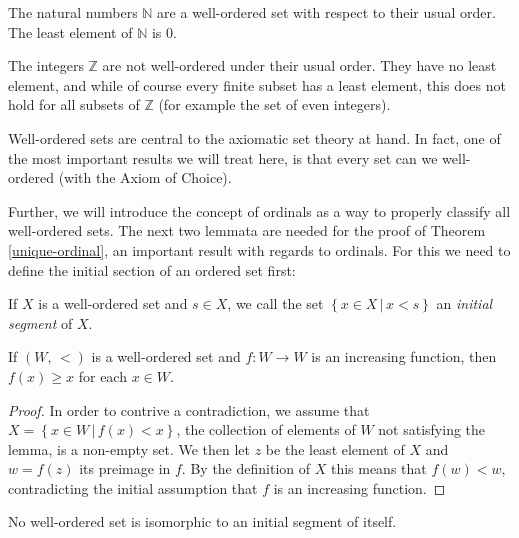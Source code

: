 \documentclass[../../main.tex]{subfiles}
\begin{document}
\begin{example}
    The natural numbers $\mathbb{N}$ are a well-ordered set with respect to their usual order.
    The least element of $\mathbb{N}$ is $0$.
\end{example}

\begin{example}
    The integers $\mathbb{Z}$ are not well-ordered under their usual order.
    They have no least element, and while of course every finite subset has a least element, 
    this does not hold for all subsets of $\mathbb{Z}$ (for example the set of even integers).
\end{example}

Well-ordered sets are central to the axiomatic set theory at hand.
In fact, one of the most important results we will treat here, is that every set can we well-ordered (with the Axiom of Choice).

Further, we will introduce the concept of ordinals as a way to properly classify all well-ordered sets.
The next two lemmata are needed for the proof of Theorem \ref{unique-ordinal}, an important result with regards to ordinals.
For this we need to define the initial section of an ordered set first:

\begin{definition}
    If $X$ is a well-ordered set and $s \in X$, we call the set $\left\{x \in X \,\vert\, x < s\right\}$ an \textit{initial segment} of $X$.
\end{definition}

\begin{lemma}\label{increasing-fcn-lemm}\cite[Lemma 2.1, p.13]{Jec78}
    If $\left(W,\, <\right)$ is a well-ordered set and $f: W \to W$ is an increasing function, then $f(x) \geq x$ for each $x\in W$.
\end{lemma}

\begin{proof}
    In order to contrive a contradiction, we assume that $X = \left\{x \in W \,\vert\, f(x) < x\right\}$, the collection of elements of $W$ not satisfying the lemma, is a non-empty set.
    We then let $z$ be the least element of $X$ and $w = f(z)$ its preimage in $f$.
    By the definition of $X$ this means that $f(w) < w$, contradicting the initial assumption that $f$ is an increasing function.
\end{proof}

\begin{lemma}\cite[Lemma 2.2, p.13]{Jec78}\label{initial-segment-isomorphism}
    No well-ordered set is isomorphic to an initial segment of itself.
\end{lemma}
\end{document}
